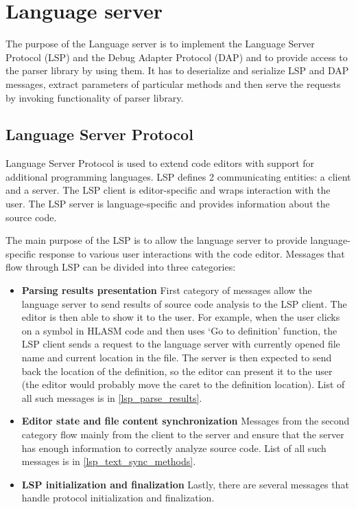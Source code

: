 \chapter{Language server}

The purpose of the Language server is to implement the Language Server Protocol (LSP) and the Debug Adapter Protocol (DAP) and to provide access to the parser library by using them. It has to deserialize and serialize LSP and DAP messages, extract parameters of particular methods and then serve the requests by invoking functionality of parser library.

\section{Language Server Protocol}
Language Server Protocol is used to extend code editors with support for additional programming languages. LSP defines 2 communicating entities: a client and a server. The LSP client is editor-specific and wraps interaction with the user. The LSP server is language-specific and provides information about the source code.

The main purpose of the LSP is to allow the language server to provide language-specific response to various user interactions with the code editor. Messages that flow through LSP can be divided into three categories:

\begin{itemize}
	\item \textbf{Parsing results presentation} First category of messages allow the language server to send results of source code analysis to the LSP client. The editor is then able to show it to the user. For example, when the user clicks on a symbol in HLASM code and then uses `Go to definition' function, the LSP client sends a request to the language server with currently opened file name and current location in the file. The server is then expected to send back the location of the definition, so the editor can present it to the user (the editor would probably move the caret to the definition location). List of all such messages is in \cref{lsp_parse_results}.

	\item \textbf{Editor state and file content synchronization} Messages from the second category flow mainly from the client to the server and ensure that the server has enough information to correctly analyze source code. List of all such messages is in \cref{lsp_text_sync_methods}.
	
	\item \textbf{LSP initialization and finalization} Lastly, there are several messages that handle protocol initialization and finalization.
\end{itemize}


